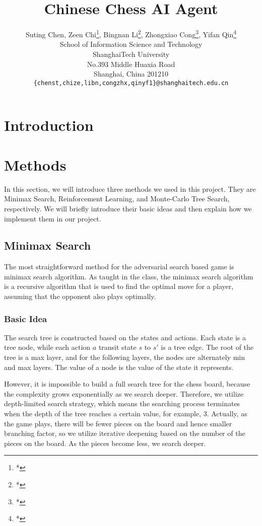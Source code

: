 \documentclass[letterpaper]{article}
\title{Chinese Chess AI Agent}
\author{Suting Chen, Zeen Chi\footnote[2]{*}, Bingnan Li\footnote[2]{*}, Zhongxiao Cong\footnote[2]{*}, Yifan Qin\footnote[2]{*}\\
School of Information Science and Technology\\
ShanghaiTech University\\
No.393 Middle Huaxia Road\\
Shanghai, China 201210\\
\texttt{\{chenst,chize,libn,congzhx,qinyf1\}@shanghaitech.edu.cn}
}
\begin{document}
\maketitle

\begin{abstract}
\begin{quote}

\end{quote}
\end{abstract}

\section{Introduction}\label{sec:introduction}


\section{Methods}\label{sec:methods}

In this section, we will introduce three methods we used in this project.
They are Minimax Search, Reinforcement Learning, and Monte-Carlo Tree Search, respectively.
We will briefly introduce their basic ideas and then explain how we implement them in our project.

\subsection{Minimax Search}\label{subsec:minimax-search}
The most straightforward method for the adversarial search based game is minimax search algorithm.
As taught in the class, the minimax search algorithm is a recursive algorithm that is used to find the optimal move for a player, assuming that the opponent also plays optimally.
\subsubsection*{Basic Idea}
The search tree is constructed based on the states and actions.
Each state is a tree node, while each action $a$ transit state $s$ to $s'$ is a tree edge.
The root of the tree is a max layer, and for the following layers, the nodes are alternately min and max layers.
The value of a node is the value of the state it represents.

However, it is impossible to build a full search tree for the chess board, because the complexity grows exponentially as we search deeper.
Therefore, we utilize depth-limited search strategy, which means the searching process terminates when the depth of the tree reaches a certain value, for example, 3.
Actually, as the game plays, there will be fewer pieces on the board and hence smaller branching factor, so we utilize iterative deepening based on the number of the pieces on the board.
As the pieces become less, we search deeper.
\end{document}
